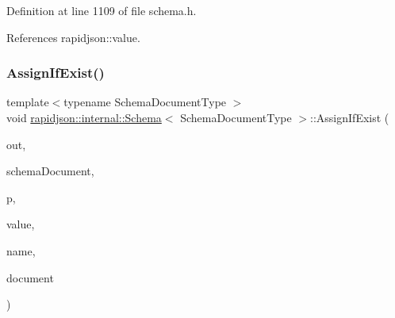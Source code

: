 Definition at line 1109 of file schema.\+h.


\begin{DoxyCode}{0}

\end{DoxyCode}


References rapidjson\+::value.

\mbox{\label{classrapidjson_1_1internal_1_1_schema_a874c4f834613256a3b4c1f1cabcfe62d}} 
\subsubsection{\texorpdfstring{AssignIfExist()}{AssignIfExist()}\hspace{0.1cm}{\footnotesize\ttfamily [3/3]}}
{\footnotesize\ttfamily template$<$typename Schema\+Document\+Type $>$ \\
void \mbox{\hyperlink{classrapidjson_1_1internal_1_1_schema}{rapidjson\+::internal\+::\+Schema}}$<$ Schema\+Document\+Type $>$\+::Assign\+If\+Exist (\begin{DoxyParamCaption}\item[{\mbox{\hyperlink{structrapidjson_1_1internal_1_1_schema_1_1_schema_array}{Schema\+Array}} \&}]{out,  }\item[{Schema\+Document\+Type \&}]{schema\+Document,  }\item[{const \mbox{\hyperlink{classrapidjson_1_1internal_1_1_schema_aa54c71c41aa8a9091565d12ffe27627c}{Pointer\+Type}} \&}]{p,  }\item[{const \mbox{\hyperlink{classrapidjson_1_1internal_1_1_schema_a3979a9083c598195927c08c6e3ba91d1}{Value\+Type}} \&}]{value,  }\item[{const \mbox{\hyperlink{classrapidjson_1_1internal_1_1_schema_a3979a9083c598195927c08c6e3ba91d1}{Value\+Type}} \&}]{name,  }\item[{const \mbox{\hyperlink{classrapidjson_1_1internal_1_1_schema_a3979a9083c598195927c08c6e3ba91d1}{Value\+Type}} \&}]{document }\end{DoxyParamCaption})\hspace{0.3cm}{\ttfamily [private]}}



